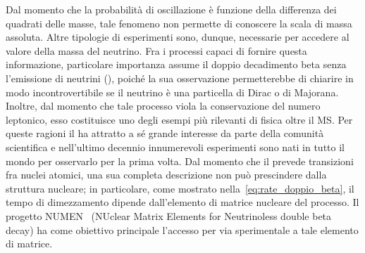 Dal momento che la probabilità di oscillazione è funzione della differenza dei quadrati delle masse, tale fenomeno non permette di conoscere la scala di massa assoluta. 
Altre tipologie di esperimenti sono, dunque, necessarie per accedere al valore della massa del neutrino.
Fra i processi capaci di fornire questa informazione, particolare importanza assume il doppio decadimento beta senza l'emissione di neutrini (\doppiobeta), poiché la sua osservazione permetterebbe di chiarire in modo incontrovertibile se il neutrino è una particella di Dirac o di Majorana.
Inoltre, dal momento che tale processo viola la conservazione del numero leptonico, esso costituisce uno degli esempi più rilevanti di fisica oltre il MS.
Per queste ragioni il \doppiobeta{} ha attratto a sé grande interesse da parte della comunità scientifica e nell'ultimo decennio innumerevoli esperimenti sono nati in tutto il mondo per osservarlo per la prima volta.
%
%
%
%
%
%
%
%
Dal momento che il \doppiobeta{} prevede transizioni fra nuclei atomici, una sua completa descrizione non può prescindere dalla struttura nucleare; in particolare, come mostrato nella~\ref{eq:rate_doppio_beta}, il tempo di dimezzamento dipende dall'elemento di matrice nucleare del processo.
Il progetto NUMEN~\cite{cappuzzello:epja18} (NUclear Matrix Elements for Neutrinoless double beta decay) ha come obiettivo principale l'accesso per via sperimentale a tale elemento di matrice.
 
